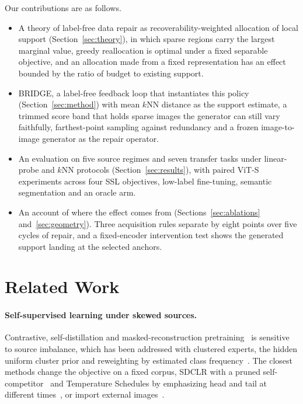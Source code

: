 \documentclass{article}
\newcommand{\method}{BRIDGE}
\begin{document}
Our contributions are as follows.
\begin{itemize}
\setlength{\itemsep}{1pt}
\item A theory of label-free data repair as recoverability-weighted allocation of local support (Section~\ref{sec:theory}), in which sparse regions carry the largest marginal value, greedy reallocation is optimal under a fixed separable objective, and an allocation made from a fixed representation has an effect bounded by the ratio of budget to existing support.
\item \method, a label-free feedback loop that instantiates this policy (Section~\ref{sec:method}) with mean $k$NN distance as the support estimate, a trimmed score band that holds sparse images the generator can still vary faithfully, farthest-point sampling against redundancy and a frozen image-to-image generator as the repair operator.
\item An evaluation on five source regimes and seven transfer tasks under linear-probe and $k$NN protocols (Section~\ref{sec:results}), with paired ViT-S experiments across four SSL objectives, low-label fine-tuning, semantic segmentation and an oracle arm.
\item An account of where the effect comes from (Sections~\ref{sec:ablations} and~\ref{sec:geometry}). Three acquisition rules separate by eight points over five cycles of repair, and a fixed-encoder intervention test shows the generated support landing at the selected anchors.
\end{itemize}

\section{Related Work}
\label{sec:background}
\paragraph{Self-supervised learning under skewed sources.}
Contrastive, self-distillation and masked-reconstruction pretraining~\citep{chen2020simple,he2020momentum,DINO,oquab2023dinov2,dinov3,he2022masked} is sensitive to source imbalance, which has been addressed with clustered experts, the hidden uniform cluster prior and reweighting by estimated class frequency~\citep{tian2021divide,assran2210hidden,fassl}. The closest methods change the objective on a fixed corpus, SDCLR with a pruned self-competitor~\citep{sdclr} and Temperature Schedules by emphasizing head and tail at different times~\citep{ts}, or import external images~\citep{colt}.
\end{document}
